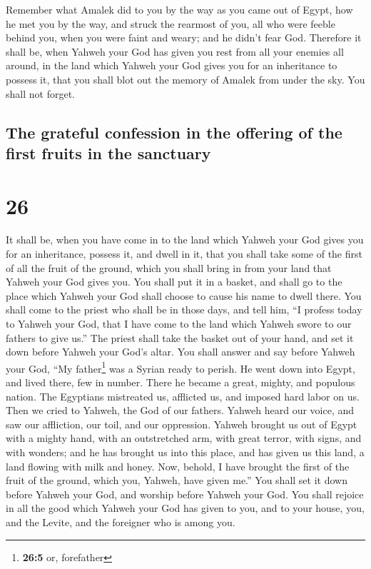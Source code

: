  Remember what Amalek did to you by the way as you came
out of Egypt,  how he met you by the way, and struck the
rearmost of you, all who were feeble behind you, when you were faint and
weary; and he didn't fear God.  Therefore it shall be,
when Yahweh your God has given you rest from all your enemies all
around, in the land which Yahweh your God gives you for an inheritance
to possess it, that you shall blot out the memory of Amalek from under
the sky. You shall not forget.

\hypertarget{the-grateful-confession-in-the-offering-of-the-first-fruits-in-the-sanctuary}{%
\subsection{The grateful confession in the offering of the first fruits
in the
sanctuary}\label{the-grateful-confession-in-the-offering-of-the-first-fruits-in-the-sanctuary}}

\hypertarget{section-25}{%
\section{26}\label{section-25}}

 It shall be, when you have come in to the land which
Yahweh your God gives you for an inheritance, possess it, and dwell in
it,  that you shall take some of the first of all the
fruit of the ground, which you shall bring in from your land that Yahweh
your God gives you. You shall put it in a basket, and shall go to the
place which Yahweh your God shall choose to cause his name to dwell
there.  You shall come to the priest who shall be in those
days, and tell him, ``I profess today to Yahweh your God, that I have
come to the land which Yahweh swore to our fathers to give us.''
 The priest shall take the basket out of your hand, and
set it down before Yahweh your God's altar.  You shall
answer and say before Yahweh your God, ``My father\footnote{\textbf{26:5}
  or, forefather} was a Syrian ready to perish. He went down into Egypt,
and lived there, few in number. There he became a great, mighty, and
populous nation.  The Egyptians mistreated us, afflicted
us, and imposed hard labor on us.  Then we cried to
Yahweh, the God of our fathers. Yahweh heard our voice, and saw our
affliction, our toil, and our oppression.  Yahweh brought
us out of Egypt with a mighty hand, with an outstretched arm, with great
terror, with signs, and with wonders;  and he has brought
us into this place, and has given us this land, a land flowing with milk
and honey.  Now, behold, I have brought the first of the
fruit of the ground, which you, Yahweh, have given me.'' You shall set
it down before Yahweh your God, and worship before Yahweh your God.
 You shall rejoice in all the good which Yahweh your God
has given to you, and to your house, you, and the Levite, and the
foreigner who is among you.

